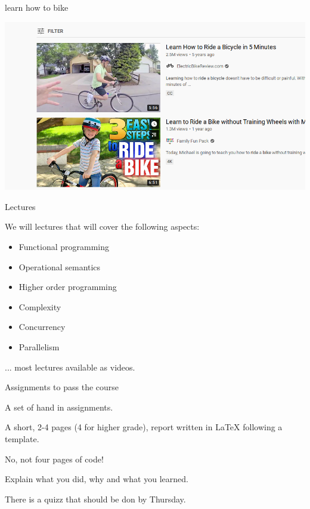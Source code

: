 \begin{frame}{learn how to bike}

  \pause
  \includegraphics[scale=0.6]{learn.png} 

\end{frame}

\begin{frame}{Lectures}

   We will lectures that will cover the following aspects:

  \begin{itemize}
    \item Functional programming
\pause
    \item Operational semantics
\pause
    \item Higher order programming
\pause
    \item Complexity 
\pause
    \item Concurrency 
\pause
    \item Parallelism
  \end{itemize}

\vspace{20pt}\hspace{40pt} ... most lectures available as videos.  

\end{frame}

\begin{frame}{Assignments to pass the course}

  A set of hand in assignments.

  \vspace{20pt}\pause
  A short, 2-4 pages (4 for higher grade), report written in LaTeX following a template.

  \vspace{20pt}\pause
  No, not four pages of code!

  \vspace{20pt}\pause
  Explain what you did, why and what you learned.

  \vspace{20pt}\pause
  There is a quizz that should be don by Thursday.
  
  
\end{frame}


